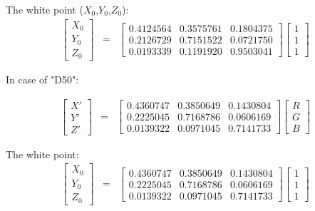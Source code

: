 The white point ($X_0$,$Y_0$,$Z_0$): 
\begin{eqnarray}
	\begin{bmatrix}	X_0 \\ Y_0 \\ Z_0 \end{bmatrix} 
	&=& \begin{bmatrix} 0.4124564 &  0.3575761 &  0.1804375 \\  0.2126729 & 0.7151522 & 0.0721750 \\ 0.0193339 &  0.1191920 & 0.9503041 \end{bmatrix} 
	\begin{bmatrix}	1 \\ 1 \\ 1 \end{bmatrix}
	\label{eqmat1}
\end{eqnarray}

In case of "D50":

\begin{eqnarray}
	\begin{bmatrix}	X'\\ Y' \\ Z' \end{bmatrix} 
	&=& \begin{bmatrix} 0.4360747 &  0.3850649 &  0.1430804 \\  0.2225045 & 0.7168786 & 0.0606169 \\ 0.0139322 &  0.0971045 & 0.7141733 \end{bmatrix} 
	\begin{bmatrix}	R \\ G \\ B \end{bmatrix}
	\label{eqmat1}
\end{eqnarray}

The white point:
\begin{eqnarray}
	\begin{bmatrix}	X_0 \\ Y_0 \\ Z_0 \end{bmatrix} 
	&=& \begin{bmatrix} 0.4360747 &  0.3850649 &  0.1430804 \\  0.2225045 & 0.7168786 & 0.0606169 \\ 0.0139322 &  0.0971045 & 0.7141733 \end{bmatrix} 
	\begin{bmatrix}	1 \\ 1 \\ 1 \end{bmatrix}
	\label{eqmat1}
\end{eqnarray}

